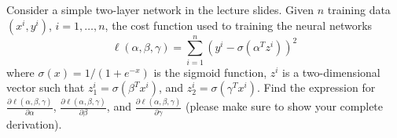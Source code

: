 \documentclass[twoside,10pt]{article}
\begin{document}
Consider a simple two-layer network in the lecture slides. Given $n$ training data $(x^i, y^i)$, $i = 1, \ldots, n$, the cost function used to training the neural networks
\[
\ell(\alpha, \beta, \gamma) = \sum_{i=1}^n (y^i - \sigma(\alpha^T z^i))^2
\]
where $\sigma (x) = 1/(1+e^{-x})$ is the sigmoid function, $z^i$ is a two-dimensional vector such that  $z_1^i = \sigma(\beta^T x^i)$, and $z_2^i = \sigma(\gamma^T x^i)$. Find the expression for $\frac{\partial\ell(\alpha, \beta, \gamma)  }{\partial \alpha}$,  $\frac{\partial\ell(\alpha, \beta, \gamma)  }{\partial \beta}$, and $\frac{\partial\ell(\alpha, \beta, \gamma)  }{\partial \gamma}$ (please make sure to show your complete derivation). 
\end{document}
